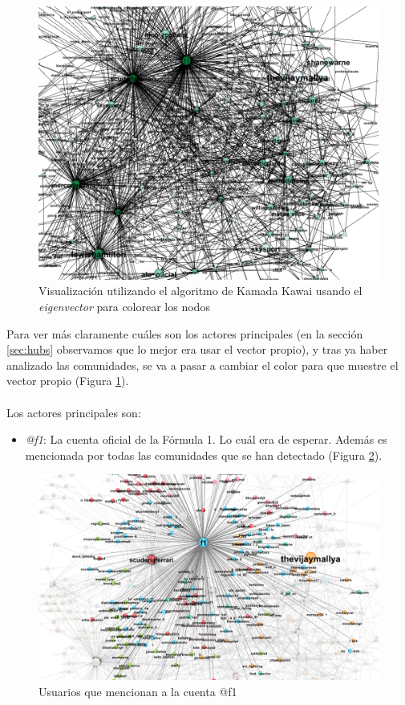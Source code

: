 \begin{figure}[H]
	\centering
	\includegraphics[width=14cm]{img/eigenvector}
	\caption{Visualización utilizando el algoritmo de Kamada Kawai usando el \textit{eigenvector} para colorear los nodos}
	\label{fig:eigenvector}
\end{figure}

Para ver más claramente cuáles son los actores principales (en la sección \ref{sec:hubs} observamos que lo mejor era usar el vector propio), y tras ya haber analizado las comunidades, se va a pasar a cambiar el color para que muestre el vector propio (Figura \ref{fig:eigenvector}).
\\ \\
Los actores principales son:

\begin{itemize}
	\item \textit{@f1}: La cuenta oficial de la Fórmula 1. Lo cuál era de esperar. Además es mencionada por todas las comunidades que se han detectado (Figura \ref{fig:f1-mentions}).
\end{itemize}

\begin{figure}[H]
	\centering
	\includegraphics[width=12cm]{img/f1-mentions}
	\caption{Usuarios que mencionan a la cuenta @f1}
	\label{fig:f1-mentions}
\end{figure}


